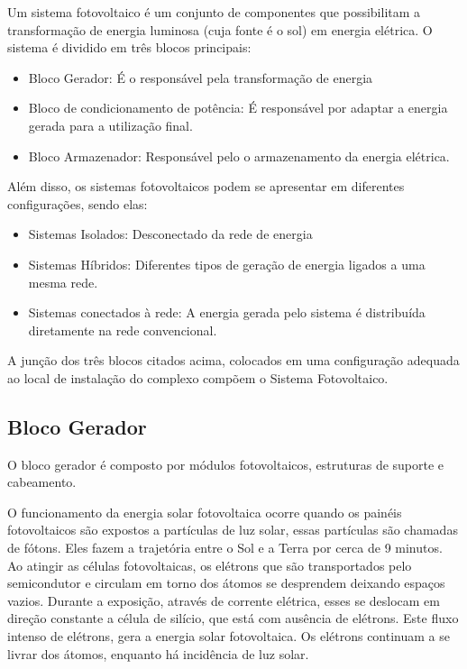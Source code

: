 Um sistema fotovoltaico é um conjunto de componentes que possibilitam a transformação de energia luminosa (cuja fonte é o sol) em energia elétrica. O sistema é dividido em três blocos principais:

\begin{itemize}
	\item Bloco Gerador: É o responsável pela transformação de energia
	\item Bloco de condicionamento de potência: É responsável por adaptar a energia gerada para a utilização final.
	\item Bloco Armazenador: Responsável pelo o armazenamento da energia elétrica.
\end{itemize}

Além disso, os sistemas fotovoltaicos podem se apresentar em diferentes configurações, sendo elas:

\begin{itemize}
	\item Sistemas Isolados: Desconectado da rede de energia
	\item Sistemas Híbridos: Diferentes tipos de geração de energia ligados a uma mesma rede.
	\item Sistemas conectados à rede: A energia gerada pelo sistema é distribuída diretamente na rede convencional.
\end{itemize}

A junção dos três blocos citados acima, colocados em uma configuração adequada ao local de instalação do complexo compõem o Sistema Fotovoltaico. 

\subsection{Bloco Gerador}

O bloco gerador é composto por módulos fotovoltaicos, estruturas de suporte e cabeamento.

O funcionamento da energia solar fotovoltaica ocorre quando os painéis fotovoltaicos são expostos a partículas de luz solar, essas partículas são chamadas de fótons. Eles fazem a trajetória entre o Sol e a Terra por cerca de 9 minutos.  Ao atingir as células fotovoltaicas, os elétrons que são transportados pelo semicondutor e circulam em torno dos átomos se desprendem deixando espaços vazios. Durante a exposição, através de corrente elétrica, esses se deslocam em direção constante a célula de silício, que está com ausência de elétrons. Este fluxo intenso de elétrons,  gera a energia solar fotovoltaica. Os elétrons continuam a se livrar dos átomos, enquanto há incidência de luz solar.

